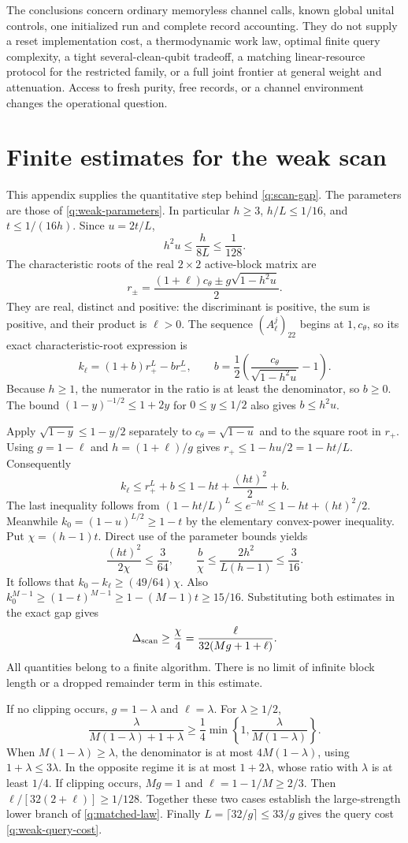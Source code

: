 \documentclass[11pt,a4paper]{article}
\numberwithin{equation}{section}
\theoremstyle{definition}
\theoremstyle{remark}
\begin{document}
The conclusions concern ordinary memoryless channel calls, known global
unital controls, one initialized run and complete record accounting.
They do not supply a reset implementation cost, a thermodynamic work law,
optimal finite query complexity, a tight several-clean-qubit tradeoff, a
matching linear-resource protocol for the restricted family, or a full
joint frontier at general weight and attenuation. Access to fresh purity,
free records, or a channel environment changes the operational question.

\appendix
\section{Finite estimates for the weak scan}
\label{q:weak-scan-appendix}

This appendix supplies the quantitative step behind \eqref{q:scan-gap}.
The parameters are those of \eqref{q:weak-parameters}. In particular
$h\geq3$, $h/L\leq1/16$, and $t\leq1/(16h)$. Since
$u=2t/L$,
\[
 h^2u\leq\frac{h}{8L}\leq\frac1{128}.
\]
The characteristic roots of the real $2\times2$ active-block matrix are
\[
 r_\pm=\frac{(1+\ell)c_\theta
                   \pm g\sqrt{1-h^2u}}2 .
\]
They are real, distinct and positive: the discriminant is positive, the sum
is positive, and their product is $\ell>0$.
The sequence $(A_\ell^j)_{22}$ begins at $1,c_\theta$, so its exact
characteristic-root expression is
\[
 k_\ell=(1+b)r_+^L-b r_-^L,\qquad
 b=\frac12\left(\frac{c_\theta}{\sqrt{1-h^2u}}-1\right).
\]
Because $h\geq1$, the numerator in the ratio is at least the denominator,
so $b\geq0$. The bound $(1-y)^{-1/2}\leq1+2y$ for $0\leq y\leq1/2$
also gives $b\leq h^2u$.

Apply $\sqrt{1-y}\leq1-y/2$ separately to $c_\theta=\sqrt{1-u}$
and to the square root in $r_+$. Using $g=1-\ell$ and
$h=(1+\ell)/g$ gives
$r_+\leq1-hu/2=1-ht/L$. Consequently
\[
 k_\ell\leq r_+^L+b
 \leq1-ht+\frac{(ht)^2}{2}+b .
\]
The last inequality follows from
$(1-ht/L)^L\leq e^{-ht}\leq1-ht+(ht)^2/2$.
Meanwhile $k_0=(1-u)^{L/2}\geq1-t$ by the elementary convex-power
inequality. Put $\chi=(h-1)t$. Direct use of the parameter bounds yields
\[
 \frac{(ht)^2}{2\chi}\leq\frac3{64},\qquad
 \frac b\chi\leq\frac{2h^2}{L(h-1)}\leq\frac3{16}.
\]
It follows that
$k_0-k_\ell\geq(49/64)\chi$.
Also $k_0^{M-1}\geq(1-t)^{M-1}
\geq1-(M-1)t\geq15/16$.
Substituting both estimates in the exact gap gives
\[
 \Delta_{\rm scan}\geq\frac{\chi}{4}
   =\frac{\ell}{32(Mg+1+\ell)}.
\]
All quantities belong to a finite algorithm. There is no limit of infinite
block length or a dropped remainder term in this estimate.

If no clipping occurs, $g=1-\lambda$ and $\ell=\lambda$. For
$\lambda\geq1/2$,
\[
 \frac{\lambda}{M(1-\lambda)+1+\lambda}
 \geq\frac14
      \min\left\{1,\frac{\lambda}{M(1-\lambda)}\right\}.
\]
When $M(1-\lambda)\geq\lambda$, the denominator is at most
$4M(1-\lambda)$, using $1+\lambda\leq3\lambda$.
In the opposite regime it is at most $1+2\lambda$, whose ratio with
$\lambda$ is at least $1/4$.
If clipping occurs, $Mg=1$ and $\ell=1-1/M\geq2/3$.
Then $\ell/[32(2+\ell)]\geq1/128$.
Together these two cases establish the large-strength lower branch of
\eqref{q:matched-law}. Finally $L=\lceil32/g\rceil\leq33/g$ gives the
query cost \eqref{q:weak-query-cost}.
\end{document}
